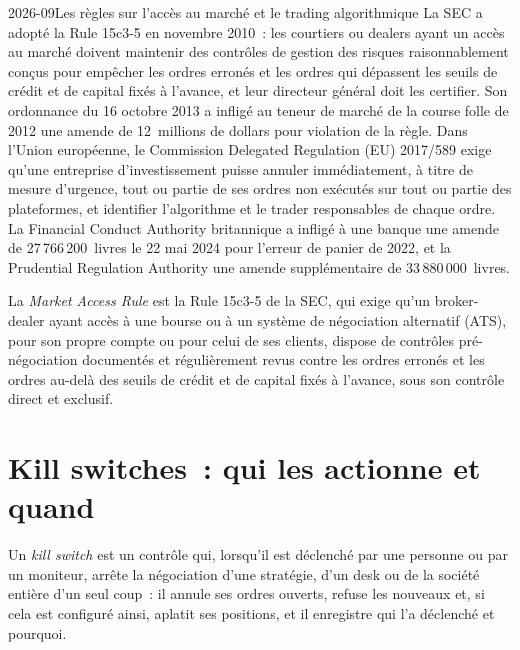 \begin{dated}{2026-09}{Les règles sur l'accès au marché et le trading algorithmique}\label{dat:hf:risk-controls:rules}
La SEC a adopté la Rule 15c3-5 en novembre 2010~: les courtiers ou dealers ayant un accès au marché doivent maintenir des contrôles de gestion des risques raisonnablement conçus
pour empêcher les ordres erronés et les ordres qui dépassent les seuils de crédit et de capital fixés à l'avance, et leur directeur général doit les certifier. Son ordonnance du
16 octobre 2013 a infligé au teneur de marché de la course folle de 2012 une amende de 12~millions de dollars pour violation de la règle. Dans l'Union européenne, le Commission Delegated
Regulation (EU) 2017/589 exige qu'une entreprise d'investissement puisse annuler immédiatement, à titre de mesure d'urgence, tout ou partie de ses ordres non exécutés
sur tout ou partie des plateformes, et identifier l'algorithme et le trader responsables de chaque ordre. La Financial Conduct Authority britannique a infligé à une banque
une amende de 27\,766\,200~livres le 22 mai 2024 pour l'erreur de panier de 2022, et la Prudential Regulation Authority une amende supplémentaire de 33\,880\,000~livres.
\end{dated}

\begin{definition}\label{def:hf:risk-controls:access}
La \emph{Market Access Rule} est la Rule 15c3-5 de la SEC, qui exige qu'un broker-dealer ayant accès à une bourse ou à un système de négociation
alternatif (ATS), pour son propre compte ou pour celui de ses clients, dispose de contrôles pré-négociation documentés et régulièrement revus contre les ordres erronés et les ordres
au-delà des seuils de crédit et de capital fixés à l'avance, sous son contrôle direct et exclusif.
\end{definition}

\section{Kill switches~: qui les actionne et quand}

\begin{definition}\label{def:hf:risk-controls:kill}
Un \emph{kill switch} est un contrôle qui, lorsqu'il est déclenché par une personne ou par un moniteur, arrête la négociation d'une stratégie, d'un desk ou de la société entière
d'un seul coup~: il annule ses ordres ouverts, refuse les nouveaux et, si cela est configuré ainsi, aplatit ses positions, et il enregistre qui l'a déclenché et pourquoi.
\end{definition}

